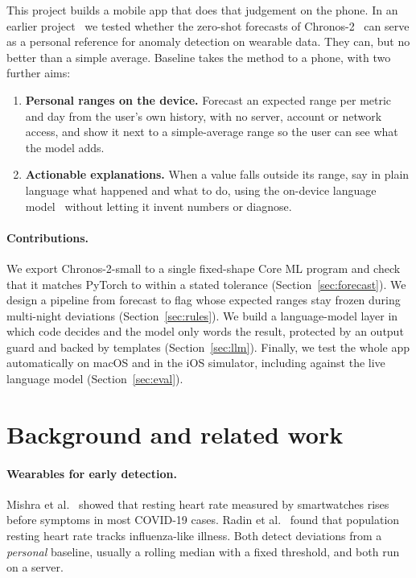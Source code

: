 \documentclass[11pt,a4paper]{article}
\begin{document}
This project builds a mobile app that does that judgement on the phone. In an earlier project~\cite{jankovikj2026chronos} we tested whether the zero-shot forecasts of Chronos-2~\cite{ansari2025chronos2} can serve as a personal reference for anomaly detection on wearable data. They can, but no better than a simple average. Baseline takes the method to a phone, with two further aims:

\begin{enumerate}
  \item \textbf{Personal ranges on the device.} Forecast an expected range per metric and day from the user's own history, with no server, account or network access, and show it next to a simple-average range so the user can see what the model adds.
  \item \textbf{Actionable explanations.} When a value falls outside its range, say in plain language what happened and what to do, using the on-device language model~\cite{apple2025afm,apple_foundationmodels} without letting it invent numbers or diagnose.
\end{enumerate}

\paragraph{Contributions.} We export Chronos-2-small to a single fixed-shape Core ML program and check that it matches PyTorch to within a stated tolerance (Section~\ref{sec:forecast}). We design a pipeline from forecast to flag whose expected ranges stay frozen during multi-night deviations (Section~\ref{sec:rules}). We build a language-model layer in which code decides and the model only words the result, protected by an output guard and backed by templates (Section~\ref{sec:llm}). Finally, we test the whole app automatically on macOS and in the iOS simulator, including against the live language model (Section~\ref{sec:eval}).

\section{Background and related work}

\paragraph{Wearables for early detection.} Mishra et al.~\cite{mishra2020covid} showed that resting heart rate measured by smartwatches rises before symptoms in most COVID-19 cases. Radin et al.~\cite{radin2020influenza} found that population resting heart rate tracks influenza-like illness. Both detect deviations from a \emph{personal} baseline, usually a rolling median with a fixed threshold, and both run on a server.
\end{document}
